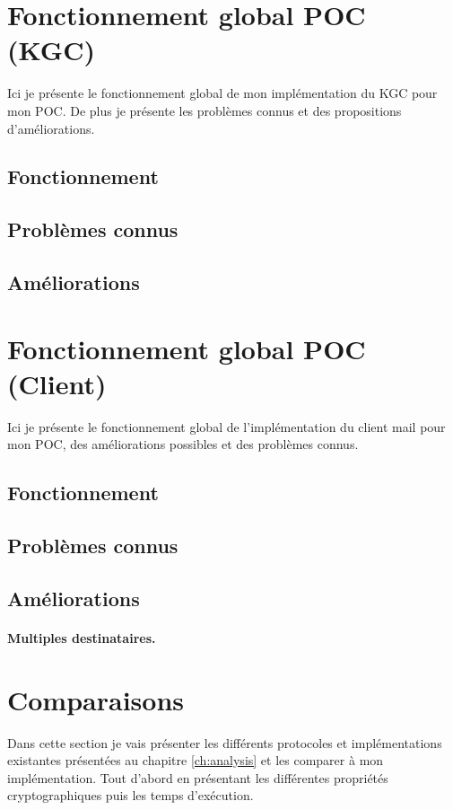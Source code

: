 \section{Fonctionnement global POC (KGC)}
Ici je présente le fonctionnement global de mon implémentation du KGC pour mon POC. De plus je présente les problèmes connus et des propositions d'améliorations.
\subsection{Fonctionnement}
\subsection{Problèmes connus}
\subsection{Améliorations}
\section{Fonctionnement global POC (Client)}
Ici je présente le fonctionnement global de l'implémentation du client mail pour mon POC, des améliorations possibles et des problèmes connus.
\subsection{Fonctionnement}
\subsection{Problèmes connus}
\subsection{Améliorations}
\paragraph*{Multiples destinataires.}
\section{Comparaisons}
Dans cette section je vais présenter les différents protocoles et implémentations existantes présentées au chapitre \ref{ch:analysis} et les comparer à mon implémentation. Tout d'abord en présentant les différentes propriétés cryptographiques puis les temps d'exécution.

